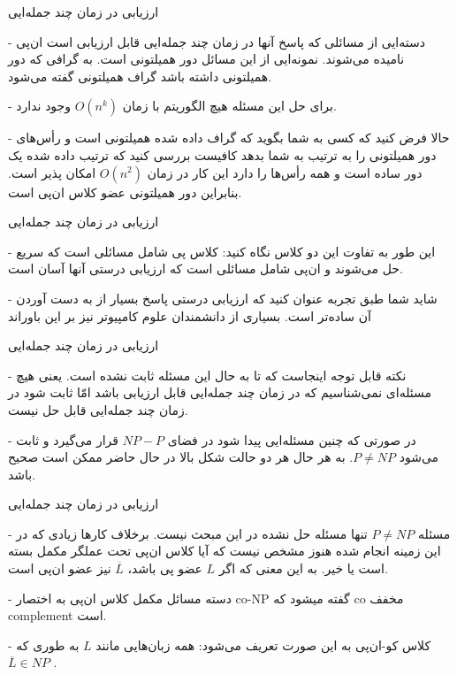 \begin{itemframe}{ارزیابی در زمان چند جمله‌ایی}
\item[-]
دسته‌ایی از مسائلی که پاسخ آنها در زمان چند جمله‌ایی قابل ارزیابی است ان‌پی نامیده می‌شوند. نمونه‌ایی از این مسائل دور همیلتونی است. به گرافی که دور همیلتونی داشته باشد گراف همیلتونی
 گفته می‌شود.
\item[-]
برای حل این مسئله هیچ الگوریتم با زمان
$O(n^k)$
وجود ندارد.
\item[-]
حالا فرض کنید که کسی به شما بگوید که گراف داده شده همیلتونی است و رأس‌های دور همیلتونی را به ترتیب به شما بدهد کافیست بررسی کنید که ترتیب داده شده یک دور ساده است و همه رأس‌ها را دارد این کار در زمان
$O(n^2)$
امکان پذیر است. بنابراین دور همیلتونی عضو کلاس ان‌پی است.

\end{itemframe}

\begin{itemframe}{ارزیابی در زمان چند جمله‌ایی}
\item [-]
این طور به تفاوت این دو کلاس نگاه کنید:‌ کلاس پی شامل مسائلی است که سریع حل می‌شوند و ان‌پی شامل مسائلی است که ارزیابی درستی آنها آسان است.
\item [-]
شاید شما طبق تجربه عنوان کنید که ارزیابی درستی پاسخ بسیار از به دست آوردن آن ساده‌تر است. بسیاری از دانشمندان علوم کامپیوتر نیز بر این باوراند


\end{itemframe}

\begin{itemframe}{ارزیابی در زمان چند جمله‌ایی}
\item [-]
نکته قابل توجه اینجاست که تا به حال این مسئله ثابت نشده است. یعنی هیچ مسئله‌ای نمی‌شناسیم که در زمان چند جمله‌ایی قابل ارزیابی باشد امّا ثابت شود در زمان چند جمله‌ایی قابل حل نیست.


\item [-]
در صورتی که چنین مسئله‌ایی پیدا شود در فضای
$NP - P$
قرار می‌گیرد و ثابت می‌شود
$P \neq NP$.
به هر حال هر دو حالت شکل بالا در حال حاضر ممکن است صحیح باشد.
\end{itemframe}

\begin{itemframe}{ارزیابی در زمان چند جمله‌ایی}
\item [-]
مسئله
$P \neq NP$
تنها مسئله حل نشده در این مبحث نیست. برخلاف کار‌ها زیادی که در این زمینه انجام شده هنوز مشخص نیست که آیا کلاس ان‌پی تحت عملگر مکمل بسته است یا خیر. به این معنی که اگر
$L$
عضو پی باشد،
$\overline{L}$
نیز عضو ان‌پی است.
\item [-]
دسته مسائل مکمل کلاس ان‌پی به اختصار co-NP گفته میشود که co مخفف complement است.
\item [-]
کلاس کو-ان‌پی به این صورت تعریف می‌شود: همه زبان‌هایی مانند
$ L $
 به طوری که
$\overline{L} \in NP$ .

\end{itemframe}


